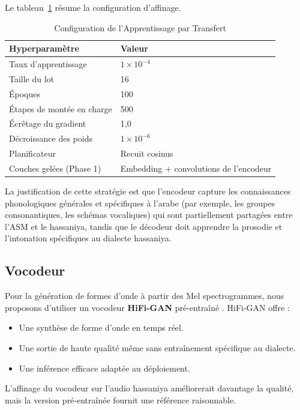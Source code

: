 \documentclass[12pt,a4paper]{article}
\begin{document}
Le tableau~\ref{tab:transfer_config} résume la configuration d'affinage.

\begin{table}[H]
\centering
\caption{Configuration de l'Apprentissage par Transfert}
\label{tab:transfer_config}
\begin{tabular}{ll}
\toprule
\textbf{Hyperparamètre} & \textbf{Valeur} \\
\midrule
Taux d'apprentissage & $1 \times 10^{-4}$ \\
Taille du lot & 16 \\
Époques & 100 \\
Étapes de montée en charge & 500 \\
Écrêtage du gradient & 1,0 \\
Décroissance des poids & $1 \times 10^{-6}$ \\
Planificateur & Recuit cosinus \\
Couches gelées (Phase 1) & Embedding + convolutions de l'encodeur \\
\bottomrule
\end{tabular}
\end{table}

La justification de cette stratégie est que l'encodeur capture les connaissances phonologiques générales et spécifiques à l'arabe (par exemple, les groupes consonantiques, les schémas vocaliques) qui sont partiellement partagées entre l'ASM et le hassaniya, tandis que le décodeur doit apprendre la prosodie et l'intonation spécifiques au dialecte hassaniya.

\subsection{Vocodeur}

Pour la génération de formes d'onde à partir des Mel spectrogrammes, nous proposons d'utiliser un vocodeur \textbf{HiFi-GAN} pré-entraîné \citep{kong2020hifi}. HiFi-GAN offre :
\begin{itemize}
    \item Une synthèse de forme d'onde en temps réel.
    \item Une sortie de haute qualité même sans entraînement spécifique au dialecte.
    \item Une inférence efficace adaptée au déploiement.
\end{itemize}

L'affinage du vocodeur sur l'audio hassaniya améliorerait davantage la qualité, mais la version pré-entraînée fournit une référence raisonnable.
\end{document}
